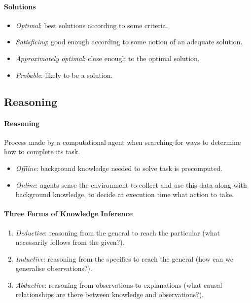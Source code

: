 \documentclass[twocolumn,english]{article}
\begin{document}
\paragraph{Solutions}
\begin{itemize}
\item \emph{Optimal}: best solutions according to some criteria.
\item \emph{Satisficing}: good enough according to some notion of an adequate
solution.
\item \emph{Approximately optimal}: close enough to the optimal solution.
\item \emph{Probable}: likely to be a solution.
\end{itemize}

\subsection{Reasoning}

\paragraph{Reasoning}

Process made by a computational agent when searching for ways to determine
how to complete its task.
\begin{itemize}
\item \emph{Offline}: background knowledge needed to solve task is precomputed.
\item \emph{Online}: agents sense the environment to collect and use this
data along with background knowledge, to decide at execution time
what action to take.
\end{itemize}

\paragraph{Three Forms of Knowledge Inference}
\begin{enumerate}
\item \emph{Deductive}: reasoning from the general to reach the particular
(what necessarily follows from the given?).
\item \emph{Inductive}: reasoning from the specifics to reach the general
(how can we generalise observations?).
\item \emph{Abductive}: reasoning from observations to explanations (what
causal relationships are there between knowledge and observations?).
\end{enumerate}
\end{document}
